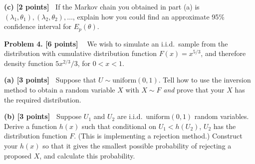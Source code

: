 \documentclass{article}
\newcommand{\svskip}{\vspace{.2in}}
\newcommand{\lvskip}{\vspace{.5in}}
\begin{document}
\svskip
{\bf(c) [2 points]\ }
If the Markov chain you obtained in part (a) is $(\lambda_1, \theta_1),
(\lambda_2, \theta_2), \ldots$,
explain how you could find an approximate 95\% confidence interval 
for $E_p(\theta)$.

\lvskip
{\bf Problem 4. [6 points] \ }
We wish to simulate an i.i.d.~sample from the distribution with
cumulative distribution function $F(x) = x^{5/3}$, and therefore
density function $5x^{2/3}/3$, for $0<x<1$.

\svskip
{\bf(a) [3 points]\ }
Suppose that $U\sim\mbox{uniform}(0,1)$.  Tell how to use the inversion method
to obtain a random variable $X$ with $X\sim F$ {\em and} prove that
your $X$ has the required distribution.

\svskip
{\bf(b) [3 points]\ }
Suppose $U_1$ and $U_2$ are i.i.d.~$\mbox{uniform}(0,1)$ random variables.
Derive a function $h(x)$ such that conditional on $U_1<h(U_2)$,
$U_2$ has the distribution function $F$.  (This is implementing a rejection method.)
Construct your $h(x)$ so that it gives the smallest possible probability of rejecting
a proposed $X$, and calculate this probability.
\end{document}
